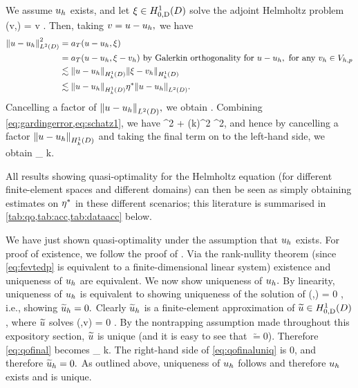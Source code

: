 We assume $u_{h}$ exists, and let $\xi \in \HozDD$ solve the adjoint Helmholtz problem
\beqs
\aT(v,\xi) =  \tforall v \in \HozDD.
\eeqs
Then, taking $v = u-u_{h},$ we have
\begin{align}
  \NLtD{u-\uh}^2 &= \aT(u-\uh,\xi)\label{eq:schatz0}\\
  &=\aT(u-\uh,\xi - \vh) \text{ by Galerkin orthogonality for } u-\uh, \text{ for any } \vh \in \Vhp\nonumber\\
  &\lesssim \NHokD{u-\uh}\NHokD{\xi-\vh}\nonumber\\
  &\lesssim \NHokD{u-\uh} \wbaadj \NLtD{u-\uh}\nonumber.
\end{align}
Cancelling a factor of $\NLtD{u-\uh},$ we obtain
\beq\label{eq:schatz1}
 \lesssim \wbaadj {}.
\eeq
Combining \cref{eq:gardingerror,eq:schatz1}, we have
\beqs
{}^2 \lesssim {} + \mleft(k\wbaadj\mright)^2 ^2,
\eeqs
and hence by cancelling a factor $\NHokD{u-\uh}$ and taking the final term on to the left-hand side, we obtain
\beq\label{eq:qofinal}
 \lesssim \inf_{\vh \in \Vhp}  \tif k\wbaadj {}.
\eeq

All results showing quasi-optimality for the Helmholtz equation (for different finite-element spaces and different domains) can then be seen as simply obtaining estimates on $\eta^{*}$ in these different scenarios; this literature is summarised in \cref{tab:qo,tab:acc,tab:dataacc} below.

We have just shown quasi-optimality under the assumption that $u_{h}$ exists. For proof of existence, we follow the proof of \cite[Theorem 5.21]{Sp:15}. Via the rank-nullity theorem (since \cref{eq:fevtedp} is equivalent to a finite-dimensional linear system) existence and uniqueness of $u_{h}$ are equivalent. We now show uniqueness of $u_{h}.$ By linearity, uniqueness of $u_{h}$ is equivalent to showing uniqueness of the solution of
\beqs\label{eq:uniqproof}
\aT\mleft(\uhtilde,\vh\mright) = 0 \tforall \vh \in \Vhp,
\eeqs
i.e., showing $\widetilde{u}_{h} = 0.$ Clearly $\widetilde{u}_{h}$ is a finite-element approximation of $\utilde \in \HozDD$, where $\widetilde{u}$ solves
\beqs
\aT\mleft(\utilde,v\mright) = 0 \tforall \vh \in \Vhp.
\eeqs
By the nontrapping assumption made throughout this expository section, $\widetilde{u}$ is unique (and it is easy to see that $\utilde = 0$). Therefore \cref{eq:qofinal} becomes
\beq\label{eq:qofinaluniq}
\NHokD{\uhtilde} \lesssim \inf_{\vh \in \Vhp} \NHokD{\vh} \tif k\wbaadj {}.
\eeq
The right-hand side of \cref{eq:qofinaluniq} is 0, and therefore $\widetilde{u}_{h}=0.$ As outlined above, uniqueness of $u_{h}$ follows and therefore $u_{h}$ exists and is unique.


